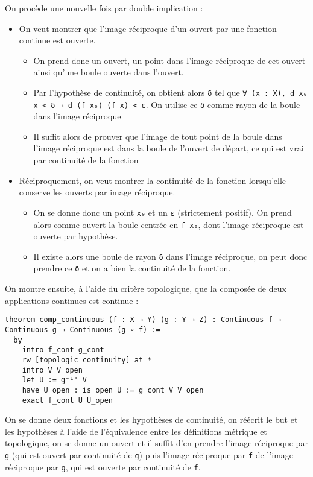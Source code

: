 \documentclass[a4paper, 12pt]{article}
\newcommand{\lean}[1]{\texttt{#1}}
\begin{document}
On procède une nouvelle fois par double implication :
\begin{itemize}
    \item On veut montrer que l'image réciproque d'un ouvert par une fonction continue est ouverte.
        \begin{itemize}
            \item On prend donc un ouvert, un point dans l'image réciproque de cet ouvert ainsi qu'une boule ouverte dans l'ouvert.
            \item Par l'hypothèse de continuité, on obtient alors \lean{δ} tel que \lean{∀ (x : X), d x₀ x < δ → d (f x₀) (f x) < ε}. On utilise ce \lean{δ} comme rayon de la boule dans l'image réciproque
            \item Il suffit alors de prouver que l'image de tout point de la boule dans l'image réciproque est dans la boule de l'ouvert de départ, ce qui est vrai par continuité de la fonction
        \end{itemize}
    \item Réciproquement, on veut montrer la continuité de la fonction lorsqu'elle conserve les ouverts par image réciproque.
        \begin{itemize}
            \item On se donne donc un point \lean{x₀} et un \lean{ε} (strictement positif). On prend alors comme ouvert la boule centrée en \lean{f x₀}, dont l'image réciproque est ouverte par hypothèse.
            \item Il existe alors une boule de rayon \lean{δ} dans l'image réciproque, on peut donc prendre ce \lean{δ} et on a bien la continuité de la fonction.
        \end{itemize}
\end{itemize}

On montre ensuite, à l'aide du critère topologique, que la composée de deux applications continues est continue :

\begin{verbatim}
theorem comp_continuous (f : X → Y) (g : Y → Z) : Continuous f → Continuous g → Continuous (g ∘ f) :=
  by
    intro f_cont g_cont
    rw [topologic_continuity] at *
    intro V V_open
    let U := g⁻¹' V
    have U_open : is_open U := g_cont V V_open
    exact f_cont U U_open
\end{verbatim}

On se donne deux fonctions et les hypothèses de continuité, on réécrit le but et les hypothèses à l'aide de l'équivalence entre les définitions métrique et topologique, on se donne un ouvert et il suffit d'en prendre l'image réciproque par \lean{g} (qui est ouvert par continuité de \lean{g}) puis l'image réciproque par \lean{f} de l'image réciproque par \lean{g}, qui est ouverte par continuité de \lean{f}.
\end{document}
